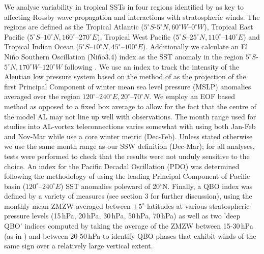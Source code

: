 We analyse variability in tropical SSTs in four regions identified by \cite{scaifeTropical2017} as key to affecting Rossby wave propagation and interactions with stratospheric winds. The regions are defined as the Tropical Atlantic ($5^{\circ}S$-$5^{\circ}N, 60^{\circ}W$–$0^{\circ}W$), Tropical East Pacific ($5^{\circ}S$–$10^{\circ}N, 160^{\circ}$–$270^{\circ}E$), Tropical West Pacific ($5^{\circ}S$–$25^{\circ}N, 110^{\circ}$–$140^{\circ}E$) and Tropical Indian Ocean ($5^{\circ}S$–$10^{\circ}N, 45^{\circ}$–$100^{\circ}E$). Additionally we calculate an El Ni\~{n}o Southern Oscillation (Ni\~{n}o3.4) index as the SST anomaly in the region $5^{\circ}S$-$5^{\circ}N, 170^{\circ}W$–$120^{\circ}W$ following \cite{trenberthIndices2001}. We use an index to track the intensity of the Aleutian low pressure system based on the method of \cite{chenPotential2020} as the projection of the first Principal Component of winter mean sea level pressure (MSLP) anomalies averaged over the region $120^{\circ}$–$240^{\circ}E, 20^{\circ}$–$70^{\circ}N$. We employ an EOF based method as opposed to a fixed box average to allow for the fact that the centre of the model AL may not line up well with observations. The month range used for studies into AL-vortex teleconnections varies somewhat with \cite{overlandDecadal1999} using both Jan-Feb and Nov-Mar while \cite{huDecadal2018} use a core winter metric (Dec-Feb). Unless stated otherwise we use the same month range as our SSW definition (Dec-Mar); for all analyses, tests were performed to check that the results were not unduly sensitive to the choice. An index for the Pacific Decadal Oscillation (PDO) was determined following the methodology of \cite{mantuaPacific1997} using the leading Principal Component of Pacific basin ($120^{\circ}$–$240^{\circ}E$) SST anomalies poleward of 20$^{\circ}$N. Finally, a QBO index was defined by a variety of measures (see section 3 for further discussion), using the monthly mean ZMZW averaged between $\pm5^{\circ}$ latitudes at various stratospheric pressure levels (15\,hPa, 20\,hPa, 30\,hPa, 50\,hPa, 70\,hPa) as well as two 'deep QBO' indices computed  by taking the average of the ZMZW between  15-30\,hPa (as in \cite{andrewsObserved2019}) and between 20-50\,hPa to identify QBO phases that exhibit winds of the same sign over a relatively large vertical extent. 

